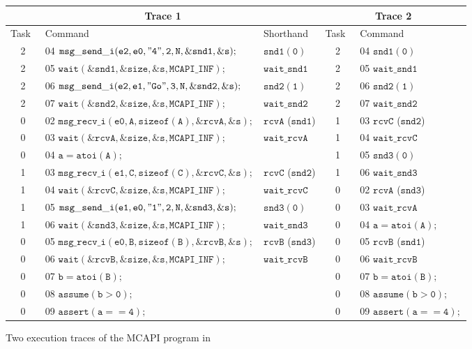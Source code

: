 \begin{figure*}
\begin{center}
\setlength{\tabcolsep}{1pt}
\scriptsize \begin{tabular}[t]{|c|l|l||c|l|}
\hline
\multicolumn{3}{|c||}{Trace 1} & \multicolumn{2}{|c|}{Trace 2}\\
\hline
Task\  & Command\ & Shorthand\ & Task\ & Command\  \\
\hline
2 & 04 $\mathtt{msg\_send\_i(e2,e0,"4",2,N,\&snd1,\&s);}$ & $\mathtt{snd1(0)}$ & 2 & 04 $\mathtt{snd1(0)}$ \\
2 & 05 $\mathtt{wait(\&snd1,\&size,\&s,MCAPI\_INF);}$ & $\mathtt{wait\_snd1}$ & 2 & 05 $\mathtt{wait\_snd1}$ \\
2 & 06 $\mathtt{msg\_send\_i(e2,e1,"Go",3,N,\&snd2,\&s);}$ & $\mathtt{snd2(1)}$ & 2 & 06 $\mathtt{snd2(1)}$ \\
2 & 07 $\mathtt{wait(\&snd2,\&size,\&s,MCAPI\_INF);}$ & $\mathtt{wait\_snd2}$ & 2 & 07 $\mathtt{wait\_snd2}$ \\
0 & 02 $\mathtt{msg\_recv\_i(e0,A,sizeof(A),\&rcvA,\&s);}$ & $\mathtt{rcvA}$ ($\mathtt{snd1}$) & 1 & 03 $\mathtt{rcvC}$ ($\mathtt{snd2}$) \\
0 & 03 $\mathtt{wait(\&rcvA,\&size,\&s,MCAPI\_INF);}$ & $\mathtt{wait\_rcvA}$ & 1 & 04 $\mathtt{wait\_rcvC}$ \\
0 & 04 $\mathtt{a = atoi(A);}$ & & 1 & 05 $\mathtt{snd3(0)}$ \\
1 & 03 $\mathtt{msg\_recv\_i(e1,C,sizeof(C),\&rcvC,\&s);}$ & $\mathtt{rcvC}$ ($\mathtt{snd2}$)& 1 & 06 $\mathtt{wait\_snd3}$ \\
1 & 04 $\mathtt{wait(\&rcvC,\&size,\&s,MCAPI\_INF);}$ & $\mathtt{wait\_rcvC}$ & 0 & 02 $\mathtt{rcvA}$ ($\mathtt{snd3}$) \\
1 & 05 $\mathtt{msg\_send\_i(e1,e0,"1",2,N,\&snd3,\&s);}$ & $\mathtt{snd3(0)}$ & 0 & 03 $\mathtt{wait\_rcvA}$ \\
1 & 06 $\mathtt{wait(\&snd3,\&size,\&s,MCAPI\_INF);}$ & $\mathtt{wait\_snd3}$ & 0 & 04 $\mathtt{a = atoi(A);}$ \\
0 & 05 $\mathtt{msg\_recv\_i(e0,B,sizeof(B),\&rcvB,\&s);}$ & $\mathtt{rcvB}$ ($\mathtt{snd3}$)& 0 & 05 $\mathtt{rcvB}$ ($\mathtt{snd1}$)\\
0 & 06 $\mathtt{wait(\&rcvB,\&size,\&s,MCAPI\_INF);}$ & $\mathtt{wait\_rcvB}$ & 0 & 06 $\mathtt{wait\_rcvB}$ \\
0 & 07 $\mathtt{b = atoi(B);}$ & & 0 & 07 $\mathtt{b = atoi(B);}$ \\
0 & 08 $\mathtt{assume (b > 0);}$ & & 0 & 08 $\mathtt{assume (b > 0);}$ \\
0 & 09 $\mathtt{assert(a == 4);}$ & & 0 & 09 $\mathtt{assert(a == 4);}$ \\
\hline
\end{tabular}
\end{center}
\caption{Two execution traces of the MCAPI program in }
\label{fig:trace}
\end{figure*}

